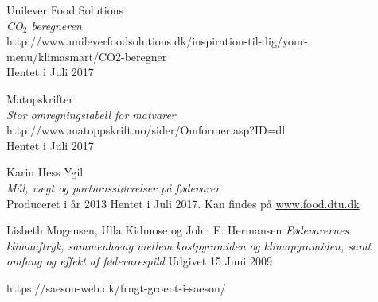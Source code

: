 \documentclass[11pt, a4paper]{article}
\newcommand{\coo}{CO$_2$ }
\begin{document}
\begin{thebibliography}{9}
	Unilever Food Solutions\\
	\textit{\coo beregneren}\\
	http://www.unileverfoodsolutions.dk/inspiration-til-dig/your-menu/klimasmart/CO2-beregner\\
	Hentet i Juli 2017
	
	Matopskrifter\\
	\textit{Stor omregningstabell for matvarer}\\
	http://www.matoppskrift.no/sider/Omformer.asp?ID=dl\\
	Hentet i Juli 2017
	
 Karin Hess Ygil\\
	\textit{Mål, vægt og portionsstørrelser på fødevarer}\\
	Produceret i år 2013
	Hentet i Juli 2017. Kan findes på \url{www.food.dtu.dk}
	
	Lisbeth Mogensen, Ulla Kidmose og John E. Hermansen
	\textit{Fødevarernes klimaaftryk,
		sammenhæng mellem kostpyramiden og klimapyramiden,
		samt omfang og effekt af fødevarespild}
	Udgivet 15 Juni 2009
	
	https://saeson-web.dk/frugt-groent-i-saeson/
	
	
\end{thebibliography}

\newpage
\end{document}
